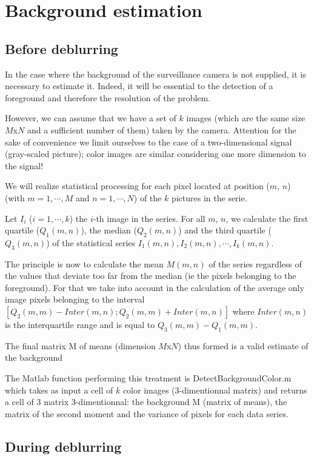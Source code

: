 \section{Background estimation}

\subsection{Before deblurring}

In the case where the background of the surveillance camera is not supplied, it is necessary to estimate it. Indeed, it will be essential to the detection of a foreground and therefore the resolution of the problem.

However, we can assume that we have a set of $k$ images (which are the same size $M$x$N$ and a sufficient number of them) taken by the camera. Attention for the sake of convenience we limit ourselves to the case of a two-dimensional signal (gray-scaled picture); color images are similar considering one more dimension to the signal!

We will realize statistical processing for each pixel located at position ($m$, $n$) (with $m =1, \cdots, M$ and $n=1, \cdots, N$) of the $k$ pictures in the serie.

Let $I_i$ ($i=1,\cdots,k$) the $i$-th image in the series. For all $m$, $n$, we calculate the first quartile ($Q_1 (m, n)$), the median ($Q_2 (m, n) $) and the third quartile ($Q_3(m, n)$) of the statistical series $I_1(m, n), I_2(m, n), \cdots, I_k(m, n)$.

The principle is now to calculate the mean $M(m, n)$ of the series regardless of the values ​​that deviate too far from the median (ie the pixels belonging to the foreground). For that we take into account in the calculation of the average only image pixels belonging to the interval $[Q_2 (m, m) - Inter (m, n); Q_2 (m, m) + Inter (m, n) ]$ where $Inter (m, n)$ is the interquartile range and is equal to $Q_3 (m, m) - Q_1 (m, m)$.

The final matrix M of means (dimension $M$x$N$) thus formed  is a valid estimate of the background

The Matlab function performing this treatment is DetectBackgroundColor.m which takes as input a cell of $ k$ color images (3-dimentionnal matrix) and returns a cell of 3 matrix 3-dimentionnal: the background M (matrix of means), the matrix of the second moment and the variance of pixels for each data series.

\subsection{During deblurring}

